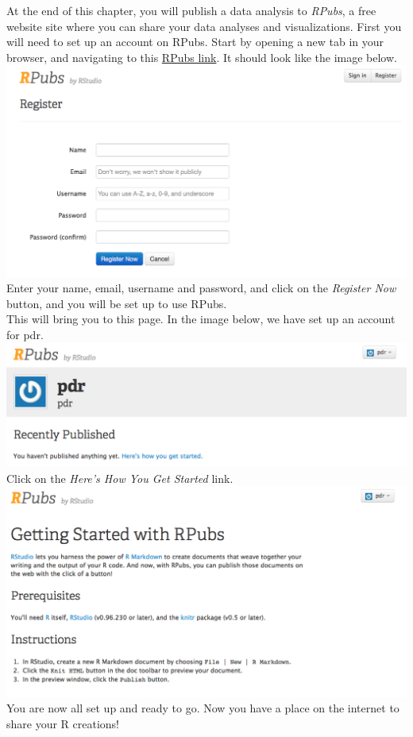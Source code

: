 \documentclass[]{book}
\begin{document}
At the end of this chapter, you will publish a data analysis to \emph{RPubs}, a free website site where you can share your data analyses and visualizations. First you will need to set up an account on RPubs. Start by opening a new tab in your browser, and navigating to this \href{https://rpubs.com/users/new}{RPubs link}. It should look like the image below.
\includegraphics{images/rpubs1.png}\\
Enter your name, email, username and password, and click on the \emph{Register Now} button, and you will be set up to use RPubs.\\
This will bring you to this page. In the image below, we have set up an account for pdr.\\
\includegraphics{images/rpubs2.png}
Click on the \emph{Here's How You Get Started} link.
\includegraphics{images/rpubs3.png}\\
You are now all set up and ready to go. Now you have a place on the internet to share your R creations!
\end{document}
